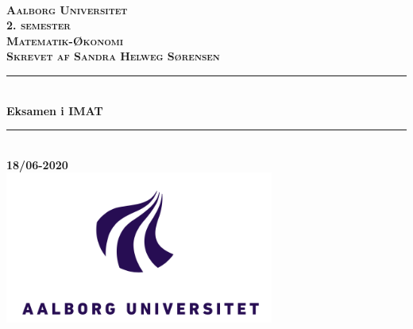 %
\begin{titlepage}

\thispagestyle{empty}

\newcommand{\HRule}{\rule{\linewidth}{0.5mm}}

\center

\textsc{}\\[2.5cm]
    
\textsc{\textbf{\LARGE Aalborg Universitet}}\\[1.5cm]

\textsc{\textbf{\Large 2. semester}}\\[0.5cm]

\textsc{\textbf{\large Matematik-Økonomi}}\\[0.5cm]

\textsc{\textbf{\large Skrevet af Sandra Helweg Sørensen}}\\[0.5cm]

\HRule \\[0.4cm]

{\huge \bfseries Eksamen i IMAT}\\[0.4cm]

\HRule\\[1.5cm]

\textbf{\large 18/06-2020}\\[1cm]

\includegraphics[height=5cm]{Formalia/AAU-logo-stud-DK-RGB.pdf}

\vfill

\end{titlepage}
\pagebreak
\thispagestyle{empty}
\phantom{a}
